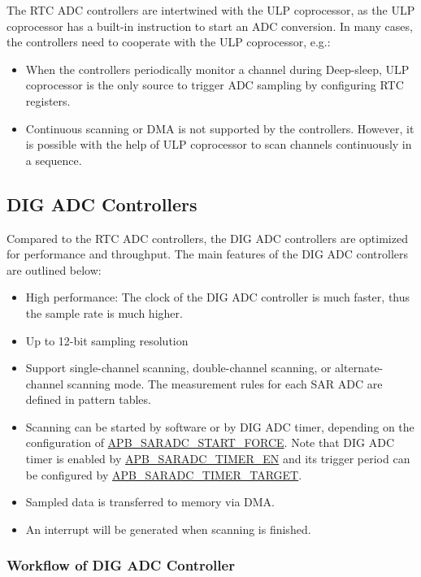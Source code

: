 \documentclass[main\_\_EN.tex]{subfiles}
\begin{document}
The RTC ADC controllers are intertwined with the ULP coprocessor, as the ULP coprocessor has a built-in instruction to start an ADC conversion. In many cases, the controllers need to cooperate with the ULP coprocessor, e.g.:

\begin{itemize}
    \item When the controllers periodically monitor a channel during Deep-sleep, ULP coprocessor is the only source to trigger ADC sampling by configuring RTC registers.
    \item Continuous scanning or DMA is not supported by the controllers. However, it is possible with the help of ULP coprocessor to scan channels continuously in a sequence.
\end{itemize}

\subsection{DIG ADC Controllers}

Compared to the RTC ADC controllers, the DIG ADC controllers are optimized for performance and throughput. The main features of the DIG ADC controllers are outlined below:

\begin{itemize}
    \item High performance: The clock of the DIG ADC controller is much faster, thus the sample rate is much higher.
\item Up to 12-bit sampling resolution
    \item Support single-channel scanning, double-channel scanning, or alternate-channel scanning mode. The measurement rules for each SAR ADC are defined in pattern tables.
    \item Scanning can be started by software or by DIG ADC timer, depending on the configuration of \hyperref[fielddesc:APBSARADCSTARTFORCE]{APB\_SARADC\_START\_FORCE}. Note that DIG ADC timer is enabled by \hyperref[fielddesc:APBSARADCTIMEREN]{APB\_SARADC\_TIMER\_EN} and its trigger period can be configured by \hyperref[fielddesc:APBSARADCTIMERTARGET]{APB\_SARADC\_TIMER\_TARGET}.
    \item Sampled data is transferred to memory via DMA.
    \item An interrupt will be generated when scanning is finished.
\end{itemize}

\subsubsection{Workflow of DIG ADC Controller}
\end{document}
